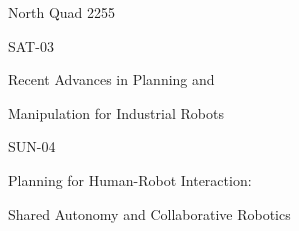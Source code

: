\documentclass{article}
\begin{document}
\rssheader[1in]

\fontsize{32pt}{36pt}
\selectfont
\begin{center}
North Quad 2255
\end{center}

\vfill

\fontsize{48pt}{56pt}
\selectfont
\begin{center}
SAT-03
\end{center}

\fontsize{24pt}{28pt}
\selectfont
\begin{center}
Recent Advances in Planning and \par \noindent Manipulation for Industrial Robots
\end{center}

\vfill

\fontsize{48pt}{56pt}
\selectfont
\begin{center}
SUN-04
\end{center}

\fontsize{24pt}{24pt}
\selectfont
\begin{center}
Planning for Human-Robot Interaction: \par \noindent Shared Autonomy and Collaborative Robotics
\end{center}

\vfill
\end{document}
